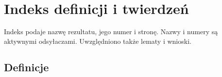 \chapter*{Indeks definicji i twierdzeń}
Indeks podaje nazwę rezultatu, jego numer i stronę. Nazwy i numery są aktywnymi odsyłaczami.
Uwzględniono także lematy i wnioski.

\section*{Definicje}
\begingroup\small
\setlength\LTleft{0pt}\setlength\LTright{0pt}
